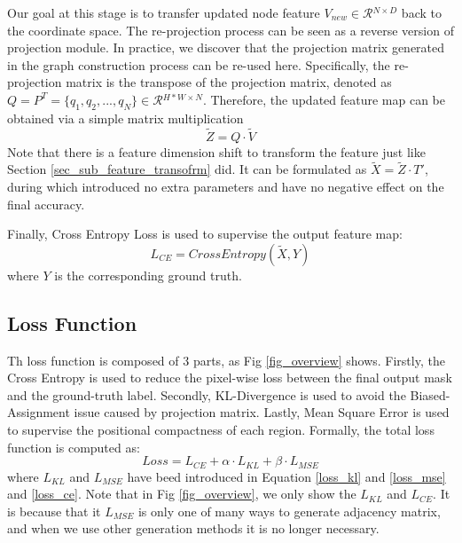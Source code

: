﻿\documentclass[journal]{IEEEtran}
\begin{document}
    Our goal at this stage is to transfer updated node feature $V_{new}\in\mathcal{R}{^{N\times D}}$ back to the coordinate space. The re-projection process can be seen as a reverse version of projection module. In practice, we discover that the projection matrix generated in the graph construction process can be re-used here. Specifically, the re-projection matrix is the transpose of the projection matrix, denoted as  $Q=P^T=\{q_1, q_2, ..., q_N \}\in \mathcal{R}{^{H*W \times N}}$. Therefore, the updated feature map can be obtained via a simple matrix multiplication
    \begin{equation}
        \tilde{Z}={Q} \cdot \tilde{V}
    \end{equation}
    Note that there is a feature dimension shift to transform the feature just like Section \ref{sec_sub_feature_transofrm} did. It can be formulated as $\tilde{X} = \tilde{Z} \cdot T'$, during which introduced no extra parameters and have no negative effect on the final accuracy.  


 
    Finally, Cross Entropy Loss is used to supervise the output feature map:
    \begin{equation}\label{loss_ce}
        L_{CE} = CrossEntropy(\tilde{X}, Y)
    \end{equation}
    where $Y$ is the corresponding ground truth.

\subsection{Loss Function}  
 
    Th loss function is composed of 3 parts, as Fig \ref{fig_overview} shows. Firstly, the Cross Entropy is used to reduce the pixel-wise loss between the final output mask and the ground-truth label. Secondly, KL-Divergence is used to avoid the Biased-Assignment issue caused by projection matrix. Lastly, Mean Square Error is used to supervise the positional compactness of each region. Formally, the total loss function is computed as:
    \begin{equation}
        Loss =  L_{CE} + \alpha  \cdot L_{KL} + \beta \cdot L_{MSE}
    \end{equation}
    where $L_{KL}$ and $L_{MSE}$ have beed introduced in Equation \ref{loss_kl} and \ref{loss_mse} and \ref{loss_ce}. Note that in Fig \ref{fig_overview}, we only show the $L_{KL}$ and $L_{CE}$. It is because that it $L_{MSE}$ is only one of many ways to generate adjacency matrix, and when we use other generation methods it is no longer necessary.  \\     
\end{document}
